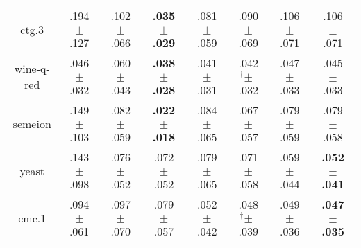 \begin{tabular}{|c|ccccccc|}
ctg.3 & .194$^{\phantom{\dag}}\pm^{\phantom{\dag}}$.127\cellcolor{red!40} & .102$^{\phantom{\dag}}\pm^{\phantom{\dag}}$.066\cellcolor{green!6} & \textbf{.035$^{\phantom{\dag}}\pm^{\phantom{\dag}}$.029}\cellcolor{green!40} & .081$^{\phantom{\dag}}\pm^{\phantom{\dag}}$.059\cellcolor{green!16} & .090$^{\phantom{\dag}}\pm^{\phantom{\dag}}$.069\cellcolor{green!12} & .106$^{\phantom{\dag}}\pm^{\phantom{\dag}}$.071\cellcolor{green!4} & .106$^{\phantom{\dag}}\pm^{\phantom{\dag}}$.071\cellcolor{green!4} \\
wine-q-red & .046$^{\phantom{\dag}}\pm^{\phantom{\dag}}$.032\cellcolor{green!10} & .060$^{\phantom{\dag}}\pm^{\phantom{\dag}}$.043\cellcolor{red!40} & \textbf{.038$^{\phantom{\dag}}\pm^{\phantom{\dag}}$.028}\cellcolor{green!40} & .041$^{\phantom{\dag}}\pm^{\phantom{\dag}}$.031\cellcolor{green!27} & .042$^{\dag}\pm^{\phantom{\dag}}$.032\cellcolor{green!24} & .047$^{\phantom{\dag}}\pm^{\phantom{\dag}}$.033\cellcolor{green!8} & .045$^{\phantom{\dag}}\pm^{\phantom{\dag}}$.033\cellcolor{green!13} \\
semeion & .149$^{\phantom{\dag}}\pm^{\phantom{\dag}}$.103\cellcolor{red!40} & .082$^{\phantom{\dag}}\pm^{\phantom{\dag}}$.059\cellcolor{green!1} & \textbf{.022$^{\phantom{\dag}}\pm^{\phantom{\dag}}$.018}\cellcolor{green!40} & .084$^{\phantom{\dag}}\pm^{\phantom{\dag}}$.065\cellcolor{green!0} & .067$^{\phantom{\dag}}\pm^{\phantom{\dag}}$.057\cellcolor{green!11} & .079$^{\phantom{\dag}}\pm^{\phantom{\dag}}$.059\cellcolor{green!3} & .079$^{\phantom{\dag}}\pm^{\phantom{\dag}}$.058\cellcolor{green!3} \\
yeast & .143$^{\phantom{\dag}}\pm^{\phantom{\dag}}$.098\cellcolor{red!40} & .076$^{\phantom{\dag}}\pm^{\phantom{\dag}}$.052\cellcolor{green!19} & .072$^{\phantom{\dag}}\pm^{\phantom{\dag}}$.052\cellcolor{green!22} & .079$^{\phantom{\dag}}\pm^{\phantom{\dag}}$.065\cellcolor{green!16} & .071$^{\phantom{\dag}}\pm^{\phantom{\dag}}$.058\cellcolor{green!22} & .059$^{\phantom{\dag}}\pm^{\phantom{\dag}}$.044\cellcolor{green!33} & \textbf{.052$^{\phantom{\dag}}\pm^{\phantom{\dag}}$.041}\cellcolor{green!40} \\
cmc.1 & .094$^{\phantom{\dag}}\pm^{\phantom{\dag}}$.061\cellcolor{red!35} & .097$^{\phantom{\dag}}\pm^{\phantom{\dag}}$.070\cellcolor{red!40} & .079$^{\phantom{\dag}}\pm^{\phantom{\dag}}$.057\cellcolor{red!10} & .052$^{\phantom{\dag}}\pm^{\phantom{\dag}}$.042\cellcolor{green!32} & .048$^{\dag}\pm^{\phantom{\dag}}$.039\cellcolor{green!37} & .049$^{\phantom{\dag}}\pm^{\phantom{\dag}}$.036\cellcolor{green!36} & \textbf{.047$^{\phantom{\dag}}\pm^{\phantom{\dag}}$.035}\cellcolor{green!40} \\

\end{tabular}
